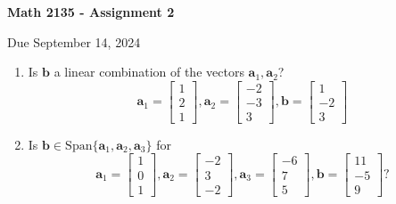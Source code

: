 \documentclass[12pt,a4paper]{amsart}
\newcommand{\ba}{\mathbf{a}}
\newcommand{\bb}{\mathbf{b}}
\begin{document}
\begin{center}
\begin{Large}
{\bf Math 2135 - Assignment 2}
\end{Large}

\bigskip
Due September 14, 2024
\end{center}

\thispagestyle{empty}

\bigskip




\begin{enumerate}

\item
 Is $\bb$ a linear combination of the vectors $\ba_1,\ba_2$?
 \[ \ba_1 = \left[ \begin{array}{c} 1 \\ 2 \\ 1 
\end{array} \right],
\ba_2 = \left[ \begin{array}{c} -2 \\ -3 \\ 3 
\end{array} \right],
\bb = \left[ \begin{array}{c} 1 \\ -2 \\ 3 
\end{array} \right] \]

\item
 Is $\mathbf{b}\in \mathrm{Span}\{\mathbf{a}_1,\mathbf{a}_2,\mathbf{a}_3\}$ for
 \[ \mathbf{a}_1 = \left[ \begin{array}{c} 1 \\ 0 \\ 1 
\end{array} \right],
\mathbf{a}_2 = \left[ \begin{array}{c} -2 \\ 3 \\ -2 
\end{array} \right],
\mathbf{a}_3 = \left[ \begin{array}{c} -6 \\ 7 \\ 5 
\end{array} \right],
\mathbf{b} = \left[ \begin{array}{c} 11 \\ -5 \\ 9 
\end{array} \right]? \]



\end{enumerate}
\end{document}
